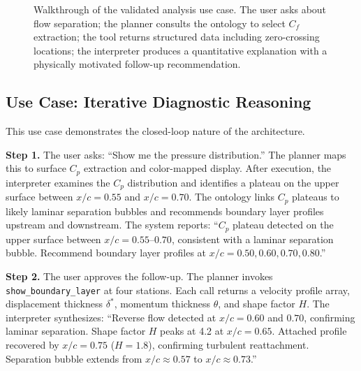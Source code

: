 \documentclass{vgtc}                          %
\begin{document}
\begin{figure}[tb]
 \centering
 \caption{Walkthrough of the validated analysis use case. The user asks
 about flow separation; the planner consults the ontology to select
 $C_f$ extraction; the tool returns structured data including zero-crossing
 locations; the interpreter produces a quantitative explanation with a
 physically motivated follow-up recommendation.}
 \label{fig:usecase_cfd}
\end{figure}

\subsection{Use Case: Iterative Diagnostic Reasoning}

This use case demonstrates the closed-loop nature of the architecture.

\textbf{Step 1.} The user asks: ``Show me the pressure distribution.''
The planner maps this to surface $C_p$ extraction and color-mapped display.
After execution, the interpreter examines the $C_p$ distribution and identifies
a plateau on the upper surface between $x/c = 0.55$ and $x/c = 0.70$.
The ontology links $C_p$ plateaus to likely laminar separation bubbles
and recommends boundary layer profiles upstream and downstream.
The system reports: ``$C_p$ plateau detected on the upper surface between
$x/c = 0.55$--$0.70$, consistent with a laminar separation bubble.
Recommend boundary layer profiles at $x/c = 0.50, 0.60, 0.70, 0.80$.''

\textbf{Step 2.} The user approves the follow-up.
The planner invokes \texttt{show\_boundary\_layer} at four stations.
Each call returns a velocity profile array, displacement thickness $\delta^*$,
momentum thickness $\theta$, and shape factor $H$.
The interpreter synthesizes: ``Reverse flow detected at $x/c = 0.60$ and $0.70$,
confirming laminar separation.
Shape factor $H$ peaks at 4.2 at $x/c = 0.65$.
Attached profile recovered by $x/c = 0.75$ ($H = 1.8$), confirming turbulent
reattachment.
Separation bubble extends from $x/c \approx 0.57$ to $x/c \approx 0.73$.''
\end{document}
